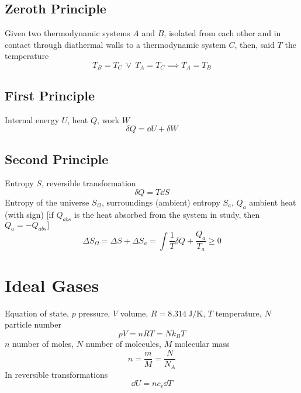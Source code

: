 \documentclass{aa}
\begin{document}
\subsection{Zeroth Principle}
Given two thermodynamic systems $A$ and $B$, isolated from each other and in contact through diathermal walls to a thermodynamic system $C$, then, said $T$ the temperature
\begin{equation}
	T_B=T_C\ \vee\ T_A=T_C\implies T_A=T_B
\end{equation}
\subsection{First Principle}
Internal energy $U$, heat $Q$, work $W$
\begin{equation}
	\delta Q = \dd U + \delta W
\end{equation}
\subsection{Second Principle}
Entropy $S$, reversible transformation
\begin{equation}
	\delta Q=T\dd S
\end{equation}
Entropy of the universe $S_{\Omega}$, surroundings (ambient) entropy $S_a$, $Q_a$ ambient heat (with sign) [if $Q_{abs}$ is the heat absorbed from the system in study, then $Q_a=-Q_{abs}]$
\begin{equation}
	\Delta S_{\Omega}=\Delta S+\Delta S_a=\int\frac{1}{T}\delta Q+\frac{Q_a}{T_a}\ge0
\end{equation}
\section{Ideal Gases}
Equation of state, $p$ pressure, $V$ volume, $R=8.314\ \mathrm{ J/K}$, $T$ temperature, $N$ particle number
\begin{equation}
	pV = nRT = Nk_BT
\end{equation}
$n$ number of moles, $N$ number of molecules, $M$ molecular mass
\begin{equation}
	n=\frac{m}{M}=\frac{N}{N_A}
\end{equation}
In reversible transformations
\begin{equation}
	\dd U=n c_v\dd T
\end{equation}
\end{document}
